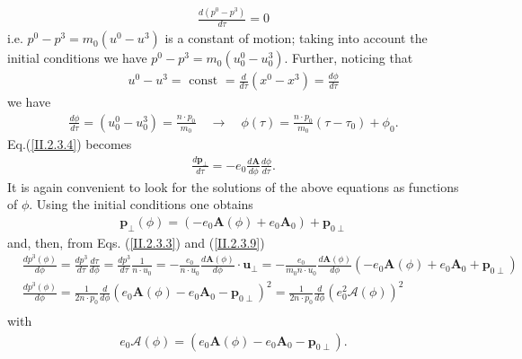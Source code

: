 \begin{align}
  \frac{d\left(p^{0}-p^{3}\right)}{d \tau}=0 \label{II.2.3.5}
\end{align}
i.e. $p^{0}-p^{3}=m_{0}\left(u^{0}-u^{3}\right)$ is a constant of motion; taking into account the initial conditions we have $p^{0}-p^{3}=m_{0}\left(u_{0}^{0}-u_{0}^{3}\right)$. Further, noticing that
\begin{align}
  u^{0}-u^{3}=\text { const }=\frac{d}{d \tau}\left(x^{0}-x^{3}\right)=\frac{d \phi}{d \tau} \label{II.2.3.6}
\end{align}
we have
\begin{align}
  \frac{d \phi}{d \tau}=\left(u_{0}^{0}-u_{0}^{3}\right)=\frac{n \cdot p_{0}}{m_{0}} \quad \longrightarrow \quad \phi(\tau)=\frac{n \cdot p_{0}}{m_{0}}\left(\tau-\tau_{0}\right)+\phi_{0} . \label{II.2.3.7}
\end{align}
Eq.(\ref{II.2.3.4}) becomes
\begin{align}
  \frac{d \mathbf{p}_{\perp}}{d \tau}=-e_{0} \frac{d \mathbf{A}}{d \phi} \frac{d \phi}{d \tau} . \label{II.2.3.8}
\end{align}
It is again convenient to look for the solutions of the above equations as functions of $\phi$. Using the initial conditions one obtains
\begin{align}
  \mathbf{p}_{\perp}(\phi)=\left(-e_{0} \mathbf{A}(\phi)+e_{0} \mathbf{A}_{0}\right)+\mathbf{p}_{0 \perp} \label{II.2.3.9}
\end{align}
and, then, from Eqs. (\ref{II.2.3.3}) and (\ref{II.2.3.9})
\begin{align}
   & \frac{d p^{3}(\phi)}{d \phi}=\frac{d p^{3}}{d \tau} \frac{d \tau}{d \phi}=\frac{d p^{3}}{d \tau} \frac{1}{n \cdot u_{0}}=-\frac{e_{0}}{n \cdot u_{0}} \frac{d \mathbf{A}(\phi)}{d \phi} \cdot \mathbf{u}_{\perp}=-\frac{e_{0}}{m_{0} n \cdot u_{0}} \frac{d \mathbf{A}(\phi)}{d \phi}\left(-e_{0} \mathbf{A}(\phi)+e_{0} \mathbf{A}_{0}+\mathbf{p}_{0 \perp}\right)  \label{II.2.3.10} \\
   & \frac{d p^{3}(\phi)}{d \phi}=\frac{1}{2 n \cdot p_{0}} \frac{d}{d \phi}\left(e_{0} \mathbf{A}(\phi)-e_{0} \mathbf{A}_{0}-\mathbf{p}_{0 \perp}\right)^{2}=\frac{1}{2 n \cdot p_{0}} \frac{d}{d \phi}\left(e_{0}^{2} \boldsymbol{\mathcal { A }}(\phi)\right)^{2} \label{II.2.3.11}                                                                                                      \\
\end{align}
with
\begin{align}
  e_{0} {\boldsymbol{\mathcal{A}}}(\phi)=\left(e_{0} \mathbf{A}(\phi)-e_{0} \mathbf{A}_{0}-\mathbf{p}_{0 \perp}\right) . \label{II.2.3.12}
\end{align}
